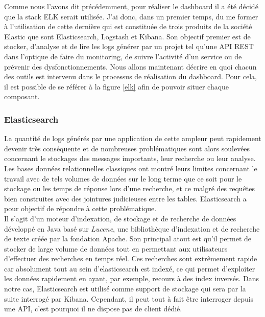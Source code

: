 	Comme nous l'avons dit précédemment, pour réaliser le dashboard il a été décidé que la stack ELK serait utilisée. J'ai donc, dans un premier temps, du me former à l'utilisation de cette dernière qui est constituée de trois produits de la société Elastic que sont Elasticsearch, Logstash et Kibana. Son objectif premier est de stocker, d'analyse et de lire les logs générer par un projet tel qu'une API REST dans l'optique de faire du monitoring, de suivre l'activité d'un service ou de prévenir des dysfonctionnements. Nous allons maintenant décrire en quoi chacun des outils est intervenu dans le processus de réalisation du dashboard. Pour cela, il est possible de se référer à la figure \ref{elk} afin de pouvoir situer chaque composant.

	\subsubsection{Elasticsearch}
	La quantité de logs générés par une application de cette ampleur peut rapidement devenir très conséquente et de nombreuses problématiques sont alors soulevées concernant le stockages des messages importants, leur recherche ou leur analyse. Les bases données relationnelles classiques ont montré leurs limites concernant le travail avec de tels volumes de données sur le long terme que ce soit pour le stockage ou les temps de réponse lors d'une recherche, et ce malgré des requêtes bien construites avec des jointures judicieuses entre les tables. Elasticsearch a pour objectif de répondre à cette problématique. \\
	
	Il s'agit d'un moteur d'indexation, de stockage et de recherche de données développé en Java basé sur \textit{Lucene}, une bibliothèque d'indexation et de recherche de texte créée par la fondation Apache. Son principal atout est qu'il permet de stocker de large volume de données tout en permettant aux utilisateurs d'effectuer des recherches en temps réel. Ces recherches sont extrêmement rapide car absolument tout au sein d'elasticsearch est indexé, ce qui permet d'exploiter les données rapidement en ayant, par exemple, recours à des index inversés. Dans notre cas, Elasticsearch est utilisé comme support de stockage qui sera par la suite interrogé par Kibana. Cependant, il peut tout à fait être interroger depuis une API, c'est pourquoi il ne dispose pas de client dédié.
	
